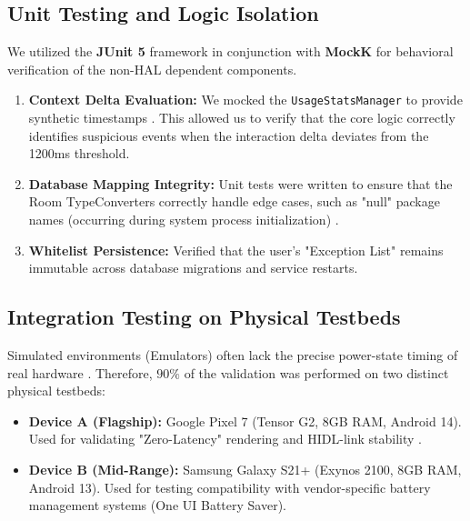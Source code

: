 \documentclass[12pt,a4paper]{report}
\begin{document}
\begin{enumerate}
\begin{itemize}
    \subsection{Unit Testing and Logic Isolation}
    We utilized the \textbf{JUnit 5} framework in conjunction with \textbf{MockK} for behavioral verification of the non-HAL dependent components.
    \begin{enumerate}
        \item \textbf{Context Delta Evaluation:} We mocked the \texttt{UsageStatsManager} to provide synthetic timestamps \cite{contextaware}. This allowed us to verify that the core logic correctly identifies suspicious events when the interaction delta deviates from the 1200ms threshold.
        \item \textbf{Database Mapping Integrity:} Unit tests were written to ensure that the Room TypeConverters correctly handle edge cases, such as "null" package names (occurring during system process initialization) \cite{smarthome}.
        \item \textbf{Whitelist Persistence:} Verified that the user's "Exception List" remains immutable across database migrations and service restarts.
    \end{enumerate}

    \subsection{Integration Testing on Physical Testbeds}
    Simulated environments (Emulators) often lack the precise power-state timing of real hardware \cite{androidhal}. Therefore, $90\%$ of the validation was performed on two distinct physical testbeds:
    \begin{itemize}
        \item \textbf{Device A (Flagship):} Google Pixel 7 (Tensor G2, 8GB RAM, Android 14). Used for validating "Zero-Latency" rendering and HIDL-link stability \cite{androidhal}.
        \item \textbf{Device B (Mid-Range):} Samsung Galaxy S21+ (Exynos 2100, 8GB RAM, Android 13). Used for testing compatibility with vendor-specific battery management systems (One UI Battery Saver).
    \end{itemize}


\end{itemize}
\end{enumerate}
\end{document}
